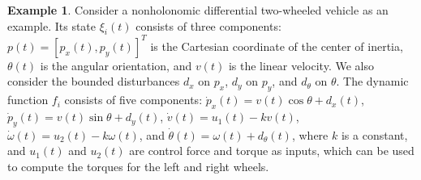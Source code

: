 \documentclass[letterpaper]{article} %
\theoremstyle{definition}
\newtheorem{example}{Example}
\begin{document}
\begin{example}\label{example:model}
Consider a nonholonomic differential two-wheeled vehicle \cite{rodriguez2014trajectory} as an example. Its state $\xi_i(t)$ consists of three components: $p(t) = [p_x(t), p_y(t)]^T$ is the Cartesian coordinate of the center of inertia, $\theta(t)$ is the angular orientation, and $v(t)$ is the linear velocity. 
We also consider the bounded disturbances $d_x$ on $p_x$, $d_y$ on $p_y$, and $d_\theta$ on $\theta$.
The dynamic function $f_i$ consists of five components: $\dot p_x(t) = v(t) \cos \theta + d_x(t)$, $\dot p_y(t) = v(t) \sin \theta + d_y(t)$, $\dot v(t) = u_1(t) - k v(t)$, $\dot \omega(t) = u_2(t) - k \omega(t)$, and $\dot \theta(t) = \omega(t) + d_\theta(t)$,
where $k$ is a constant, and $u_1(t)$ and $u_2(t)$ are control force and torque as inputs, which can be used to compute the torques for the left and right wheels.
\end{example}
\end{document}
